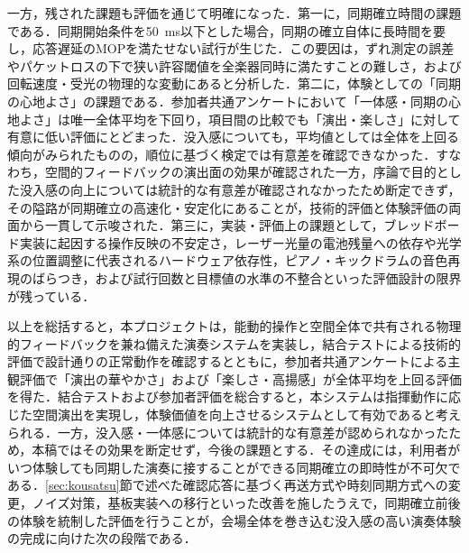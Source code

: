 一方，残された課題も評価を通じて明確になった．第一に，同期確立時間の課題である．同期開始条件を\SI{50}{ms}以下とした場合，同期の確立自体に長時間を要し，応答遅延のMOPを満たせない試行が生じた．この要因は，ずれ測定の誤差やパケットロスの下で狭い許容閾値を全楽器同時に満たすことの難しさ，および回転速度・受光の物理的な変動にあると分析した．第二に，体験としての「同期の心地よさ」の課題である．参加者共通アンケートにおいて「一体感・同期の心地よさ」は唯一全体平均を下回り，項目間の比較でも「演出・楽しさ」に対して有意に低い評価にとどまった．没入感についても，平均値としては全体を上回る傾向がみられたものの，順位に基づく検定では有意差を確認できなかった．すなわち，空間的フィードバックの演出面の効果が確認された一方，序論で目的とした没入感の向上については統計的な有意差が確認されなかったため断定できず，その隘路が同期確立の高速化・安定化にあることが，技術的評価と体験評価の両面から一貫して示唆された．第三に，実装・評価上の課題として，ブレッドボード実装に起因する操作反映の不安定さ，レーザー光量の電池残量への依存や光学系の位置調整に代表されるハードウェア依存性，ピアノ・キックドラムの音色再現のばらつき，および試行回数と目標値の水準の不整合といった評価設計の限界が残っている．

以上を総括すると，本プロジェクトは，能動的操作と空間全体で共有される物理的フィードバックを兼ね備えた演奏システムを実装し，結合テストによる技術的評価で設計通りの正常動作を確認するとともに，参加者共通アンケートによる主観評価で「演出の華やかさ」および「楽しさ・高揚感」が全体平均を上回る評価を得た．結合テストおよび参加者評価を総合すると，本システムは指揮動作に応じた空間演出を実現し，体験価値を向上させるシステムとして有効であると考えられる．一方，没入感・一体感については統計的な有意差が認められなかったため，本稿ではその効果を断定せず，今後の課題とする．その達成には，利用者がいつ体験しても同期した演奏に接することができる同期確立の即時性が不可欠である．\ref{sec:kousatsu}節で述べた確認応答に基づく再送方式や時刻同期方式への変更，ノイズ対策，基板実装への移行といった改善を施したうえで，同期確立前後の体験を統制した評価を行うことが，会場全体を巻き込む没入感の高い演奏体験の完成に向けた次の段階である．
